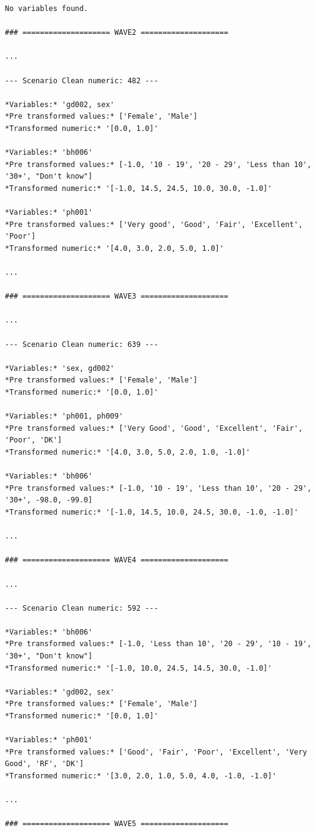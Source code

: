 \begin{mdframed}
\begin{Verbatim}[breaklines=true, breakanywhere=true]
No variables found.

### ==================== WAVE2 ====================

...

--- Scenario Clean numeric: 482 ---

*Variables:* 'gd002, sex'
*Pre transformed values:* ['Female', 'Male']  
*Transformed numeric:* '[0.0, 1.0]'

*Variables:* 'bh006'  
*Pre transformed values:* [-1.0, '10 - 19', '20 - 29', 'Less than 10', '30+', "Don't know"]  
*Transformed numeric:* '[-1.0, 14.5, 24.5, 10.0, 30.0, -1.0]'

*Variables:* 'ph001'  
*Pre transformed values:* ['Very good', 'Good', 'Fair', 'Excellent', 'Poor']  
*Transformed numeric:* '[4.0, 3.0, 2.0, 5.0, 1.0]'

...

### ==================== WAVE3 ====================

...

--- Scenario Clean numeric: 639 ---

*Variables:* 'sex, gd002'  
*Pre transformed values:* ['Female', 'Male']  
*Transformed numeric:* '[0.0, 1.0]'

*Variables:* 'ph001, ph009'  
*Pre transformed values:* ['Very Good', 'Good', 'Excellent', 'Fair', 'Poor', 'DK']  
*Transformed numeric:* '[4.0, 3.0, 5.0, 2.0, 1.0, -1.0]'

*Variables:* 'bh006'  
*Pre transformed values:* [-1.0, '10 - 19', 'Less than 10', '20 - 29', '30+', -98.0, -99.0]  
*Transformed numeric:* '[-1.0, 14.5, 10.0, 24.5, 30.0, -1.0, -1.0]'

...

### ==================== WAVE4 ====================

...

--- Scenario Clean numeric: 592 ---

*Variables:* 'bh006'  
*Pre transformed values:* [-1.0, 'Less than 10', '20 - 29', '10 - 19', '30+', "Don't know"]  
*Transformed numeric:* '[-1.0, 10.0, 24.5, 14.5, 30.0, -1.0]'

*Variables:* 'gd002, sex'
*Pre transformed values:* ['Female', 'Male']  
*Transformed numeric:* '[0.0, 1.0]'

*Variables:* 'ph001'  
*Pre transformed values:* ['Good', 'Fair', 'Poor', 'Excellent', 'Very Good', 'RF', 'DK']  
*Transformed numeric:* '[3.0, 2.0, 1.0, 5.0, 4.0, -1.0, -1.0]'

...

### ==================== WAVE5 ====================


\end{Verbatim}
\end{mdframed}
